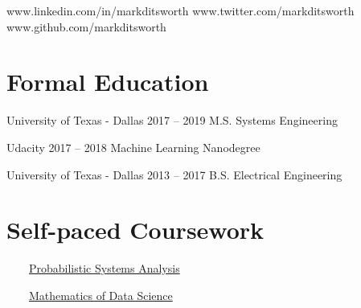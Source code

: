 \documentclass{tccv}
\begin{document}
    {www.linkedin.com/in/markditsworth}
    {www.twitter.com/markditsworth}
    {www.github.com/markditsworth}

\section{Formal Education}

\begin{yearlist} 

\item[University of Texas - Dallas]{2017 -- 2019}
     {M.S. Systems Engineering}{}

\item[Udacity]{2017 -- 2018}
	 {Machine Learning Nanodegree}{}

\item[University of Texas - Dallas]{2013 -- 2017}
     {B.S. Electrical Engineering}{}

\end{yearlist}
\vspace{-30pt}
\section{Self-paced Coursework}
\begin{factlist}
\item{\textcolor{white}{2018}}{\href{https://github.com/markditsworth/psa}{Probabilistic Systems Analysis}}
\item{\textcolor{white}{2018}}{\href{https://github.com/markditsworth/mds}{Mathematics of Data Science}}
\end{factlist}
\end{document}
